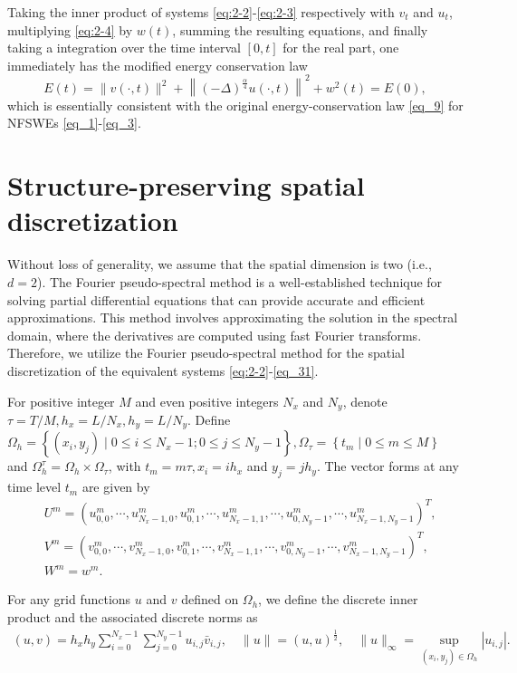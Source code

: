 \documentclass[preprint,compress,3p,10pt,fleqn]{elsarticle}
\numberwithin{equation}{section}
\begin{document}
Taking the inner product of systems \eqref{eq:2-2}-\eqref{eq:2-3} respectively with $v_t$ and $u_t$, multiplying \eqref{eq:2-4} by $w(t)$, summing the resulting equations, and finally taking a integration over the time interval $[0, t]$ for the real part, one immediately has the modified energy conservation law
\begin{equation}
E(t)=\|v(\cdot, t)\|^2+\left\|(-\Delta)^{\frac{\alpha}{4}} u(\cdot, t)\right\|^{2}+w^2(t)=E(0),
\end{equation}
which is essentially consistent with the original energy-conservation law \eqref{eq_9} for NFSWEs \eqref{eq_1}-\eqref{eq_3}.

	
\section{Structure-preserving spatial discretization}\label{Section 3}
Without loss of generality, we assume that the spatial dimension is two (i.e., $d=2$). The Fourier
pseudo-spectral method is a well-established technique for solving partial differential equations
that can provide accurate and efficient approximations. This method involves approximating the
solution in the spectral domain, where the derivatives are computed using fast Fourier transforms. Therefore, we utilize the Fourier pseudo-spectral method for the spatial discretization of the equivalent systems \eqref{eq:2-2}-\eqref{eq_31}.
	
For positive integer $M$ and even positive integers $N_{x}$ and $N_{y}$, denote $\tau\!=\!{T}/{M}, h_{x}\!=\!{L}/{N_{x}}, h_{y}\!=\!{L}/{N_{y}}$. Define $\Omega_{h}\!=\!\left\{\left(x_{i}, y_{j}\right) \mid 0 \leq i \leq N_x-1;0 \leq j \leq N_y-1\right\}, \Omega_{\tau}\!=\!\left\{t_{m} \mid 0 \leq m \leq M\right\}$ and $\Omega_{h}^{\tau}\!=\!\Omega_{h} \times \Omega_{\tau}$, with $t_{m}=m \tau, x_{i}=i h_{x}$ and $y_{j}=j h_{y}$.
The vector forms at any time level $t_m$ are given by
\begin{align}\label{eq_47}
&U^m=\left(u_{0,0}^m, \cdots, u_{N_{x}-1,0}^m, u_{0,1}^m, \cdots, u_{N_{x}-1,1}^m, \cdots, u_{0, N_{y}-1}^m, \cdots, u_{N_{x}-1, N_{y}-1}^m\right)^{T},\\
&V^m=\left(v_{0,0}^m, \cdots, v_{N_{x}-1,0}^m, v_{0,1}^m, \cdots, v_{N_{x}-1,1}^m, \cdots, v_{0, N_{y}-1}^m, \cdots, v_{N_{x}-1, N_{y}-1}^m\right)^{T},\\
&W^m=w^m.
\end{align}

For any grid functions $u$ and $v$ defined on $\Omega_{h}$, we define the discrete inner product and the associated discrete norms as
\begin{align}\label{eq_48}
(u, v)=h_{x} h_{y} \sum_{i=0}^{N_{x}-1} \sum_{j=0}^{N_{y}-1} u_{i, j} \bar{v}_{i, j}, \quad\|u\|=(u, u)^{\frac{1}{2}}, \quad\|u\|_{\infty}=\sup _{\left(x_{i}, y_{j}\right) \in \Omega_{h}}\left|u_{i, j}\right|.
\end{align}
	
\end{document}

